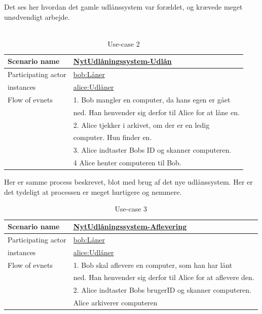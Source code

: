 \documentclass[a4paper]{article}
\begin{document}
Det ses her hvordan det gamle udlånssystem var forældet, og krævede meget unødvendigt arbejde.\\ \\
\begin{table}[h]
\caption{Use-case 2}
\begin{tabular}{ll}
Scenario name                 & \underline{NytUdlåningssystem-Udlån} \\ \hline
Participating actor           & \underline{bob:Låner} \\
instances                     & \underline{alice:Udlåner}\\ \hline
Flow of evnets                & 1. Bob mangler en computer, da hans egen er gået              	\\& ned. Han henvender sig derfor til Alice for at låne en.
\\& 2. Alice tjekker i arkivet, om der er en ledig \\& computer. Hun finder en.
\\& 3. Alice indtaster Bobs ID og skanner computeren.
\\& 4 Alice henter computeren til Bob.
\end{tabular}
\end{table}

Her er samme process beskrevet, blot med brug af det nye udlånssystem. Her er det tydeligt at processen er meget hurtigere og nemmere.
\begin{table}[h]
\caption{Use-case 3}
\begin{tabular}{ll}
Scenario name                 & \underline{NytUdlåningssystem-Aflevering} \\ \hline
Participating actor           & \underline{bob:Låner} \\
instances                     & \underline{alice:Udlåner}\\ \hline
Flow of evnets                & 1. Bob skal aflevere en computer, som han har lånt 
\\& ned. Han henvender sig derfor til Alice for at aflevere den.
\\& 2. Alice indtaster Bobs brugerID og skanner computeren.
\\& Alice arkiverer computeren
\end{tabular}
\end{table}
\end{document}

